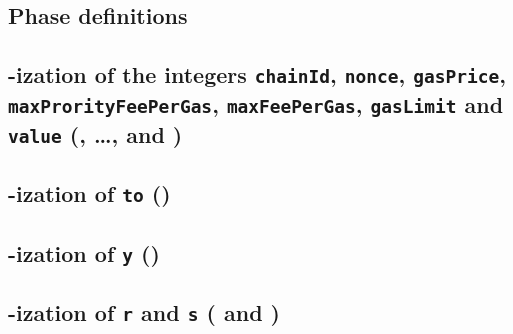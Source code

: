 \subsection{Phase definitions}              \label{rlptxn: phase definitions}                 

\subsection{\rlp{}-ization of the integers
\texttt{chainId},
\texttt{nonce},
\texttt{gasPrice},
\texttt{maxProrityFeePerGas},
\texttt{maxFeePerGas},
\texttt{gasLimit} and \texttt{value} (\phaseChainId{}, \dots, \phaseGasLimit{} and \phaseValue{})}
                                                                                              
\subsection{\rlp{}-ization of \texttt{to} (\phaseTo)}                                             
\subsection{\rlp{}-ization of \texttt{y} (\phaseY)}                                           
\subsection{\rlp{}-ization of \texttt{r} and \texttt{s} (\phaseR{} and \phaseS)}              
